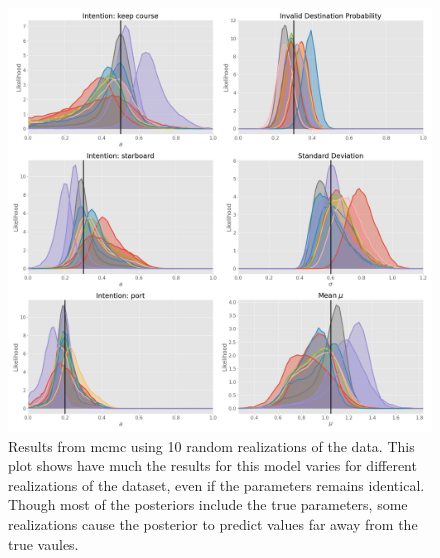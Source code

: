 \begin{figure}[h]
    \centering
    \includegraphics[width=\textwidth]{figures/mc_sim_mcmc.png}
    \caption{Results from \acrshort{mcmc} using 10 random realizations of the data. This plot shows have much the results for this model varies for different realizations of the dataset, even if the parameters remains identical. Though most of the posteriors include the true parameters, some realizations cause the posterior to predict values far away from the true vaules.}
    \label{fig:example_mc_mcmc}
\end{figure}

